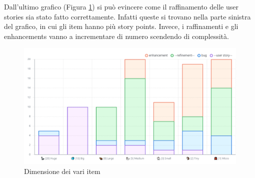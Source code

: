 Dall'ultimo grafico (Figura \ref{fig:stats-dimension}) si può evincere come il raffinamento delle user stories sia stato fatto correttamente. Infatti queste si trovano nella parte sinistra del grafico, in cui gli item hanno più story points. Invece, i raffinamenti e gli enhancements vanno a incrementare di numero scendendo di complessità.
\begin{figure}[H]
    \centering
    \includegraphics[width=\textwidth]{process/Img/charts/items-for-size.png}
    \caption{Dimensione dei vari item}
    \label{fig:stats-dimension}
\end{figure}